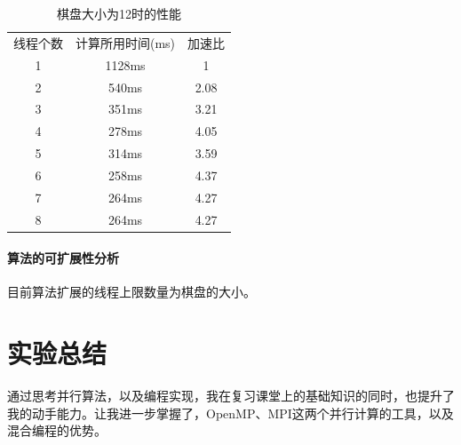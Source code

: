 \documentclass[10pt]{article}
\begin{document}
\begin{table}[htbp]
    \centering
    \caption{棋盘大小为12时的性能}
        \begin{tabular}{c|c|c}
        \hline
        线程个数 & 计算所用时间(ms) & 加速比 \\
        1 & 1128ms & 1 \\
        2 & 540ms & 2.08 \\
        3 & 351ms & 3.21 \\
        4 & 278ms & 4.05 \\
        5 & 314ms & 3.59 \\
        6 & 258ms & 4.37 \\
        7 & 264ms & 4.27 \\
        8 & 264ms & 4.27 \\
        \end{tabular}
    \label{n-queen-performance}
\end{table}

\paragraph{算法的可扩展性分析}

目前算法扩展的线程上限数量为棋盘的大小。

\section{实验总结}

通过思考并行算法，以及编程实现，我在复习课堂上的基础知识的同时，也提升了我的动手能力。让我进一步掌握了，OpenMP、MPI这两个并行计算的工具，以及混合编程的优势。
\end{document}
